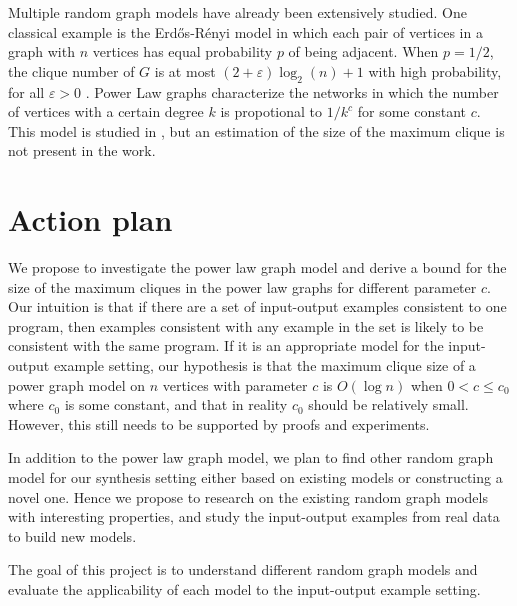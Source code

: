 \documentclass{article}
\begin{document}
Multiple random graph models have already been extensively studied. One classical example is the Erd\H{o}s-R\'enyi model \cite{erdos1960evolution} in which each pair of vertices in a graph with $n$ vertices has equal probability $p$ of being adjacent. When $p = 1/2$, the clique number of $G$ is at most $(2 + \varepsilon)\log_2(n) + 1$ with high probability, for all $\varepsilon > 0$ \cite{danielSpielman}. Power Law graphs characterize the networks in which the number of vertices with a certain degree $k$ is propotional to $1/k^c$ for some constant $c$. This model is studied in \cite{aiello2000random}, but an estimation of the size of the maximum clique is not present in the work. 


\section{Action plan}


We propose to investigate the power law graph model and derive a bound for the size of the maximum cliques in the power law graphs for different parameter $c$. Our intuition is that if there are a set of input-output examples consistent to one program, then examples consistent with any example in the set is likely to be consistent with the same program. If it is an appropriate model for the input-output example setting, our hypothesis is that the maximum clique size of a power graph model on $n$ vertices with parameter $c$ is $O(\log n)$ when $0 < c \leq c_0$ where $c_0$ is some constant, and that in reality $c_0$ should be relatively small. However, this still needs to be supported by proofs and experiments.

In addition to the power law graph model, we plan to find other random graph model for our synthesis setting either based on existing models or constructing a novel one. Hence we propose to research on the existing random graph models with interesting properties\cite{easley2010networks}, and study the input-output examples from real data to build new models.

The goal of this project is to understand different random graph models and evaluate the applicability of each model to the input-output example setting.
\end{document}
